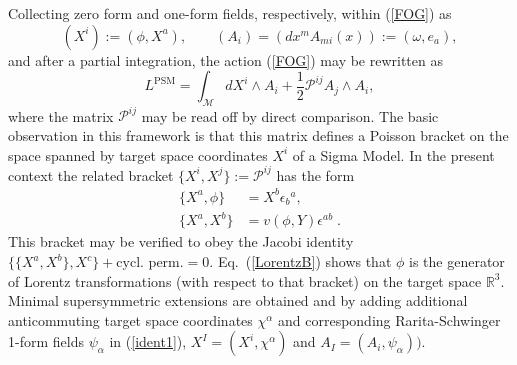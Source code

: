 \documentclass[a4paper,10pt]{article}
\newcommand{\R}{\mathbb{R}} %
\newcommand{\half}{\frac{1}{2}}
\newcommand{\BMf}{\mathcal{M}}
\newcommand{\Poisson}{\mathcal{P}}
\newcommand{\Action}{L}
\renewcommand{\^}{{}^}
\renewcommand{\_}{\!{}_}
\begin{document}
Collecting zero form and
one-form fields, respectively, within (\ref{FOG}) as
\begin{equation}
  \label{ident1}
  (X^i) := (\phi,X^a), \qquad
  (A_i) = (dx^m A_{mi}(x)) := (\omega,e_a),
\end{equation}
and after a partial integration, the action (\ref{FOG}) may be
rewritten as
\begin{equation}
  \label{PSM}
  \Action^{\mathrm{PSM}} = \int_\BMf dX^i \wedge A_i + \half
  \Poisson^{ij} A_j \wedge A_i,
\end{equation}
where the matrix $\Poisson^{ij}$ may be read off by direct comparison.
The basic observation in this framework is that this matrix defines a
Poisson bracket on the space spanned by target space 
coordinates $X^i$ of a Sigma Model. In the
present context the related  bracket $\{ X^i , X^j \} := \Poisson^{ij}$ has
the form
\begin{align}
  \{ X^a, \phi \} &= X^b \epsilon_b\^a, \label{LorentzB} \\
  \{ X^a, X^b \} &= v(\phi,Y) \epsilon^{ab}\; .  \label{PB}
\end{align} 
This bracket may be verified to obey the Jacobi identity 
$\{ \{X^a, X^b\}, X^c \} + \mbox{cycl. perm.} = 0$. 
Eq.\ (\ref{LorentzB}) shows that $\phi$ is the generator of
Lorentz transformations (with respect to that bracket) on the target
space $\R^3$. Minimal supersymmetric extensions are obtained 
\cite{Ikeda:1994ab,Izquierdo:1998hg} and \cite{Strobl:1999zz}
 by adding additional anticommuting target 
space coordinates $\chi^\alpha$ and corresponding 
Rarita-Schwinger 1-form fields $\psi_\alpha $  in 
(\ref{ident1}), $X^I = (X^i, 
\chi^\alpha)$ and $A_I = (A_i, \psi_\alpha))$. 
\end{document}
